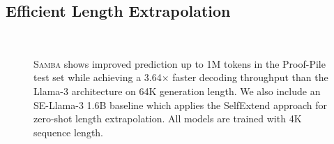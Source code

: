 \documentclass{article}
\begin{document}











\subsection{Efficient Length Extrapolation}
\begin{figure}[!htb]
    \vspace{-0.5cm}
    \centering
\hspace{0.5cm}
    \\
 \vspace{-0.2cm}
    \caption{\textsc{Samba} shows improved prediction up to 1M tokens in the Proof-Pile test set
    while achieving a 3.64$\times$ faster decoding throughput than the Llama-3 architecture on 64K generation length. 
    We also include an SE-Llama-3 1.6B baseline which applies the SelfExtend \citep{jin2024llm} approach for zero-shot length extrapolation. All models are trained with 4K sequence length. }
    \label{fig:speed}
    \vspace{-0.2cm}
\end{figure}
\end{document}

